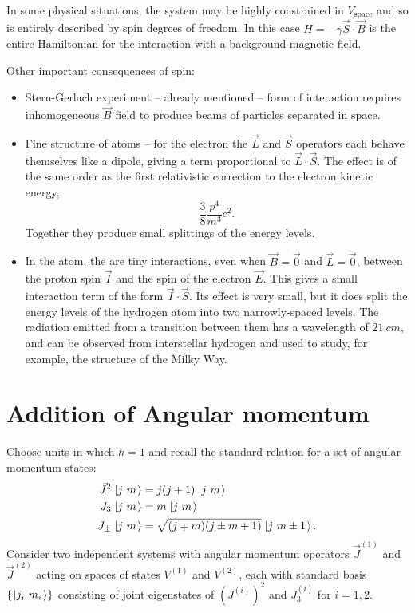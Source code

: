 \documentclass[../Main.tex]{subfiles}
\begin{document}
In some physical situations, the system may be highly constrained in $V_{\text{space}}$ and so is entirely described by spin degrees of freedom. In this case $H = -\gamma \vec{S} \cdot \vec{B}$ is the entire Hamiltonian for the interaction with a background magnetic field.


Other important consequences of spin:
\begin{itemize}
    \item Stern-Gerlach experiment -- already mentioned -- form of interaction requires inhomogeneous $\vec B$ field to produce beams of particles separated in space.
    \item Fine structure of atoms -- for the electron the $\vec L$ and $\vec S$ operators each behave themselves like a dipole, giving a term proportional to $\vec{L} \cdot \vec{S}$. The effect is of the same order as the first relativistic correction to the electron kinetic energy,
        \begin{equation*}
            \frac38 \frac{p^4}{m^3}c^2.
        \end{equation*}
        Together they produce small splittings of the energy levels.
    \item In the atom, the are tiny interactions, even when $\vec B = \vec0$ and $\vec L = \vec 0$, between the proton spin $\vec{I}$ and the spin of the electron $\vec{E}$. This gives a small interaction term of the form $\vec{I} \cdot \vec{S}$. Its effect is very small, but it does split the energy levels of the hydrogen atom into two narrowly-spaced levels. The radiation emitted from a transition between them has a wavelength of $21~cm$, and can be observed from interstellar hydrogen and used to study, for example, the structure of the Milky Way.
\end{itemize}
\section{Addition of Angular momentum}
Choose units in which $\hbar = 1$ and recall the standard relation for a set of angular momentum states:
\begin{align*}
    \vec J^2 \left.\left|j~m\right.\right\rangle &= j(j+1)\left.\left|j~m\right.\right\rangle \\
    J_3 \left.\left|j~m\right.\right\rangle &= m \left.\left|j~m\right.\right\rangle \\
    J_\pm \left.\left|j~m\right.\right\rangle &= \sqrt{(j\mp m)(j \pm m + 1)} \left.\left|j~m\pm 1\right.\right\rangle.
\end{align*}
Consider two independent systems with angular momentum operators $\vec J^{(1)}$ and $\vec J^{(2)}$ acting on spaces of states $V^{(1)}$ and $V^{(2)}$, each with standard basis $\{\left.\left|j_i~m_i\right.\right\rangle\}$ consisting of joint eigenstates of $(J^{(i)})^2$ and $J_3^{(i)}$ for $i = 1, 2$.
\end{document}
